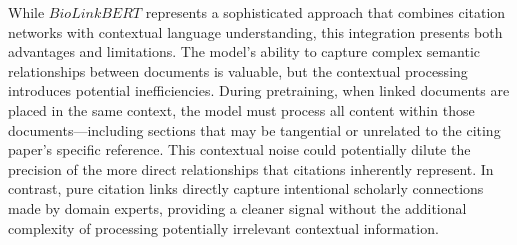 \documentclass[../main.tex]{subfiles}
\begin{document}
While $BioLinkBERT$ represents a sophisticated approach that combines citation networks with contextual language understanding, this integration presents both advantages and limitations. The model's ability to capture complex semantic relationships between documents is valuable, but the contextual processing introduces potential inefficiencies. During pretraining, when linked documents are placed in the same context, the model must process all content within those documents—including sections that may be tangential or unrelated to the citing paper's specific reference. This contextual noise could potentially dilute the precision of the more direct relationships that citations inherently represent. In contrast, pure citation links directly capture intentional scholarly connections made by domain experts, providing a cleaner signal without the additional complexity of processing potentially irrelevant contextual information.
\end{document}
